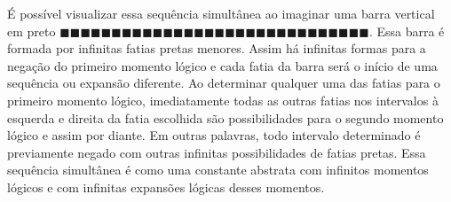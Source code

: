 É possível visualizar essa sequência simultânea ao imaginar uma barra vertical em preto $\!\blacksquare\!\blacksquare\!\blacksquare\!\blacksquare\!\blacksquare\!\blacksquare\!\blacksquare\!\blacksquare\!\blacksquare\!\blacksquare\!\blacksquare\!\blacksquare\!\blacksquare\!\blacksquare\!\blacksquare\!\blacksquare\!\blacksquare\!\blacksquare\!\blacksquare\!\blacksquare\!\blacksquare\!\blacksquare\!\blacksquare\!\blacksquare\!\blacksquare\!\blacksquare\!\blacksquare\!\blacksquare\!\blacksquare\!\blacksquare$. Essa barra é formada por infinitas fatias pretas menores. Assim há infinitas formas para a negação do primeiro momento lógico e cada fatia da barra será o início de uma sequência ou expansão diferente. Ao determinar qualquer uma das fatias para o primeiro momento lógico, imediatamente todas as outras fatias nos intervalos à esquerda e direita da fatia escolhida são possibilidades para o segundo momento lógico e assim por diante. Em outras palavras, todo intervalo determinado é previamente negado com outras infinitas possibilidades de fatias pretas. Essa sequência simultânea é como uma constante abstrata com infinitos momentos lógicos e com infinitas expansões lógicas desses momentos.








